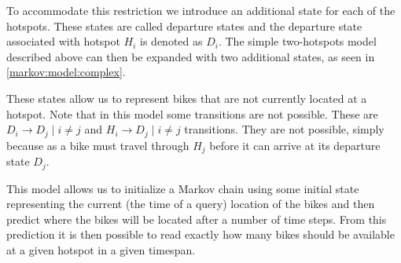 To accommodate this restriction we introduce an additional state for each of the hotspots.
These states are called departure states and the departure state associated with hotspot $H_i$ is denoted as $D_i$.
The simple two-hotspots model described above can then be expanded with two additional states, as seen in \cref{markov:model:complex}.



These states allow us to represent bikes that are not currently located at a hotspot.
Note that in this model some transitions are not possible.
These are $D_i \rightarrow D_j \mid i \neq j$ and $H_i \rightarrow D_j \mid i \neq j$ transitions.
They are not possible, simply because as a bike must travel through $H_j$ before it can arrive at its departure state $D_j$.

This model allows us to initialize a Markov chain using some initial state representing the current (the time of a query) location of the bikes and then predict where the bikes will be located after a number of time steps.
From this prediction it is then possible to read exactly how many bikes should be available at a given hotspot in a given timespan.
